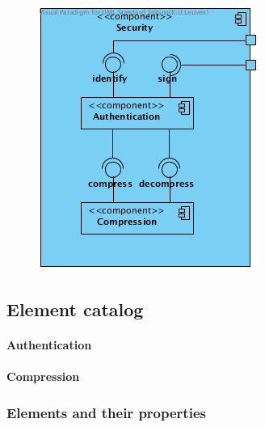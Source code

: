 \documentclass[a4paper,10pt]{paper}
\begin{document}
\begin{center}
    \begin{figure}
      \includegraphics[width=\textwidth]{../images/ClientServer_Security.png}
    \end{figure}
  \end{center}

\subsection{Element catalog}

\paragraph{Authentication}

\paragraph{Compression}

\subsubsection{Elements and their properties}
\end{document}
